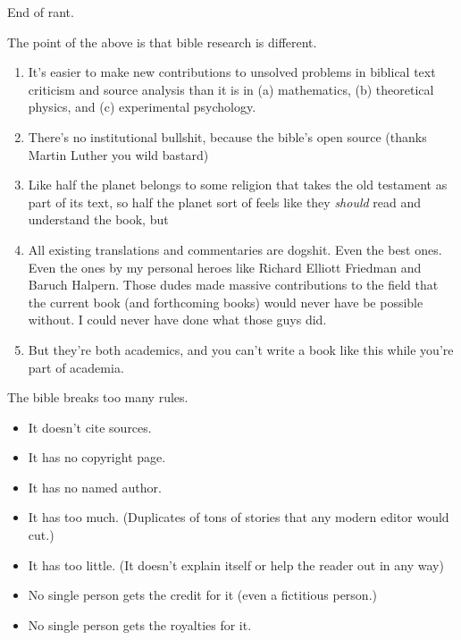 { \hX{} }
{ \eX{} }
{
    End of rant.

    The point of the above is that bible research is different.

    \begin{enumerate}

    \item It's easier to make new contributions to unsolved problems in biblical text criticism and source analysis than it is in (a) mathematics, (b) theoretical physics, and (c) experimental psychology.

    \item There's no institutional bullshit, because the bible's open source (thanks Martin Luther you wild bastard)

    \item Like half the planet belongs to some religion that takes the old testament as part of its text, so half the planet sort of feels like they \emph{should} read and understand the book, but

    \item All existing translations and commentaries are dogshit. Even the best ones. Even the ones by my personal heroes like Richard Elliott Friedman and Baruch Halpern. Those dudes made massive contributions to the field that the current book (and forthcoming books) would never have be possible without. I could never have done what those guys did.

    \item But they're both academics, and you can't write a book like this while you're part of academia.

    \end{enumerate}
}

{ \hX{} }
{ \eX{} }
{
    The bible breaks too many rules.

    \begin{itemize}

    \item It doesn't cite sources.

    \item It has no copyright page.

    \item It has no named author.

    \item It has too much. (Duplicates of tons of stories that any modern editor would cut.)

    \item It has too little. (It doesn't explain itself or help the reader out in any way)

    \item No single person gets the credit for it (even a fictitious person.)

    \item No single person gets the royalties for it.

    \end{itemize}
}

